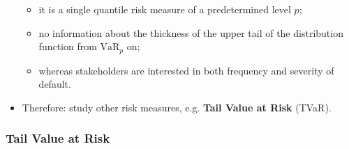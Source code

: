\documentclass[]{book}
\theoremstyle{definition}
\theoremstyle{definition}
\theoremstyle{definition}
\theoremstyle{remark}
\begin{document}
\begin{itemize}
  \begin{itemize}
  \item
    it is a single quantile risk measure of a predetermined level \(p\);
  \item
    no information about the thickness of the upper tail of the
    distribution function from \(\text{VaR}_p\) on;
  \item
    whereas stakeholders are interested in both frequency and severity
    of default.
  \end{itemize}
\item
  Therefore: study other risk measures, e.g. \textbf{Tail Value at Risk}
  (TVaR).
\end{itemize}

\subsubsection{Tail Value at Risk}\label{tail-value-at-risk}
\end{document}
